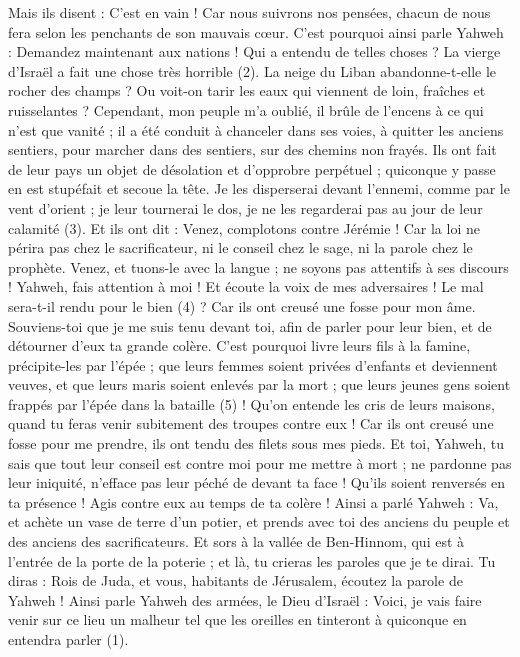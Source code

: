 \begin{multicols}{2}
Mais ils disent : C’est en vain ! Car nous suivrons nos pensées, chacun de nous fera selon les penchants de son mauvais cœur.
C'est pourquoi ainsi parle Yahweh : Demandez maintenant aux nations ! Qui a entendu de telles choses ? La vierge d'Israël a fait une chose très horrible\FTNT{} (2).
La neige du Liban abandonne-t-elle le rocher des champs ? Ou voit-on tarir les eaux qui viennent de loin, fraîches et ruisselantes ?
Cependant, mon peuple m'a oublié, il brûle de l’encens à ce qui n'est que vanité ; il a été conduit à chanceler dans ses voies, à quitter les anciens sentiers, pour marcher dans des sentiers, sur des chemins non frayés.
Ils ont fait de leur pays un objet de désolation et d’opprobre perpétuel ; quiconque y passe en est stupéfait et secoue la tête.
Je les disperserai devant l'ennemi, comme par le vent d'orient ; je leur tournerai le dos, je ne les regarderai pas au jour de leur calamité\FTNT{} (3).
Et ils ont dit : Venez, complotons contre Jérémie ! Car la loi ne périra pas chez le sacrificateur, ni le conseil chez le sage, ni la parole chez le prophète. Venez, et tuons-le avec la langue ; ne soyons pas attentifs à ses discours !
Yahweh, fais attention à moi ! Et écoute la voix de mes adversaires !
Le mal sera-t-il rendu pour le bien\FTNT{} (4) ? Car ils ont creusé une fosse pour mon âme. Souviens-toi que je me suis tenu devant toi, afin de parler pour leur bien, et de détourner d'eux ta grande colère.
C'est pourquoi livre leurs fils à la famine, précipite-les par l'épée ; que leurs femmes soient privées d'enfants et deviennent veuves, et que leurs maris soient enlevés par la mort ; que leurs jeunes gens soient frappés par l'épée dans la bataille\FTNT{} (5) !
Qu’on entende les cris de leurs maisons, quand tu feras venir subitement des troupes contre eux ! Car ils ont creusé une fosse pour me prendre, ils ont tendu des filets sous mes pieds.
Et toi, Yahweh, tu sais que tout leur conseil est contre moi pour me mettre à mort ; ne pardonne pas leur iniquité, n'efface pas leur péché de devant ta face ! Qu’ils soient renversés en ta présence ! Agis contre eux au temps de ta colère !
\VerseOne{}Ainsi a parlé Yahweh : Va, et achète un vase de terre d'un potier, et prends avec toi des anciens du peuple et des anciens des sacrificateurs.
Et sors à la vallée de Ben-Hinnom, qui est à l'entrée de la porte de la poterie ; et là, tu crieras les paroles que je te dirai.
Tu diras : Rois de Juda, et vous, habitants de Jérusalem, écoutez la parole de Yahweh ! Ainsi parle Yahweh des armées, le Dieu d'Israël : Voici, je vais faire venir sur ce lieu un malheur tel que les oreilles en tinteront à quiconque en entendra parler\FTNT{} (1).

\end{multicols}
